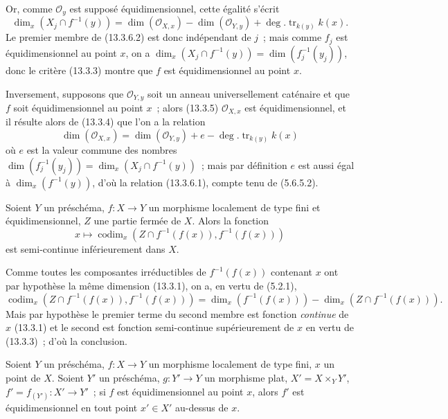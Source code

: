 Or, comme $\mathcal O_y$ est supposé équidimensionnel, cette égalité s'écrit
\[
\tag{13.3.6.2}
\label{IV.13.3.6.2-fr}
  \dim_x(X_j\cap f^{-1}(y))=\dim(\mathcal O_{X,x})
  -\dim(\mathcal O_{Y,y})+\deg.\operatorname{tr}_{k(y)}k(x).
\]
Le premier membre de (13.3.6.2) est donc indépendant de $j$~; mais comme $f_j$
est équidimensionnel au point $x$, on a
$\dim_x(X_j\cap f^{-1}(y))=\dim(f_j^{-1}(y_j))$, donc le critère (13.3.3)
montre que $f$ est équidimensionnel au point $x$.

Inversement, supposons que $\mathcal O_{Y,y}$ soit un anneau universellement
caténaire et que $f$ soit équidimensionnel au point $x$~; alors (13.3.5)
$\mathcal O_{X,x}$ est équidimensionnel, et il résulte alors de (13.3.4) que
l'on a la relation
\[
  \dim(\mathcal O_{X,x})=\dim(\mathcal O_{Y,y})+e
  -\deg.\operatorname{tr}_{k(y)}k(x)
\]
où $e$ est la valeur commune des nombres
$\dim(f_j^{-1}(y_j))=\dim_x(X_j\cap f^{-1}(y))$~; mais par définition $e$ est
aussi égal à $\dim_x(f^{-1}(y))$, d'où la relation (13.3.6.1), compte tenu de
(5.6.5.2).

\begin{proposition}[13.3.7]
\label{IV.13.3.7-fr}
Soient $Y$ un préschéma, $f:X\to Y$ un morphisme localement de type fini et
équidimensionnel, $Z$ une partie fermée de $X$. Alors la fonction
\[
\tag{13.3.7.1}
\label{IV.13.3.7.1-fr}
  x\longmapsto\operatorname{codim}_x
  (Z\cap f^{-1}(f(x)),f^{-1}(f(x)))
\]
est semi-continue inférieurement dans $X$.
\end{proposition}

Comme toutes les composantes irréductibles de $f^{-1}(f(x))$ contenant $x$
ont par hypothèse la même dimension (13.3.1), on a, en vertu de (5.2.1),
\[
  \operatorname{codim}_x(Z\cap f^{-1}(f(x)),f^{-1}(f(x)))
  =\dim_x(f^{-1}(f(x)))-\dim_x(Z\cap f^{-1}(f(x))).
\]
Mais par hypothèse le premier terme du second membre est fonction
\emph{continue} de $x$ (13.3.1) et le second est fonction semi-continue
supérieurement de $x$ en vertu de (13.3.3)~; d'où la conclusion.

\begin{proposition}[13.3.8]
\label{IV.13.3.8-fr}
Soient $Y$ un préschéma, $f:X\to Y$ un morphisme localement de type fini, $x$
un point de $X$. Soient $Y'$ un préschéma, $g:Y'\to Y$ un morphisme plat,
$X'=X\times_Y Y'$, $f'=f_{(Y')}:X'\to Y'$~; si $f$ est équidimensionnel au
point $x$, alors $f'$ est équidimensionnel en tout point $x'\in X'$ au-dessus
de $x$.
\end{proposition}

